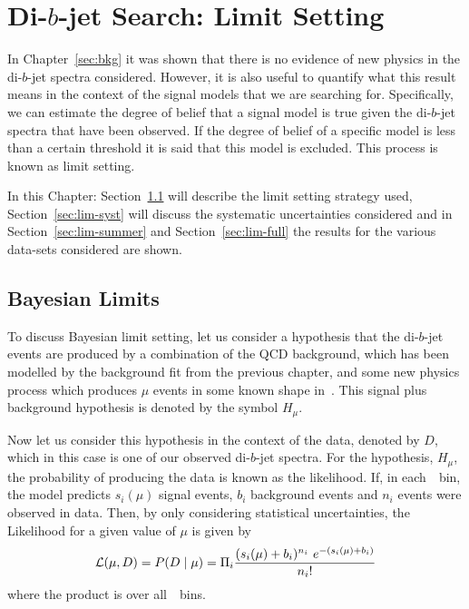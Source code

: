 \chapter{Di-$b$-jet Search: Limit Setting}
\label{sec:lim}


In Chapter~\ref{sec:bkg} it was shown that there is no evidence of new physics in the di-$b$-jet spectra considered.
However, it is also useful to quantify what this result means in the context
of the signal models that we are searching for.
Specifically, we can estimate the degree of belief that a signal model is true given the di-$b$-jet spectra that have been observed.
If the degree of belief of a specific model is less than a certain threshold it is said that this model is excluded.
This process is known as limit setting.

In this Chapter:
Section~\ref{sec:lim-strat} will describe the limit setting strategy used,
Section~\ref{sec:lim-syst} will discuss the systematic uncertainties considered
and in Section~\ref{sec:lim-summer} and Section~\ref{sec:lim-full}
the results for the various data-sets considered are shown.

\section{Bayesian Limits}
\label{sec:lim-strat}

To discuss Bayesian limit setting,
let us consider a hypothesis that the di-$b$-jet events are produced by a combination of 
the QCD background, which has been modelled by the background fit from the previous chapter,
and some new physics process 
which produces $\mu$ events in some known shape in~\mjj.
This signal plus background hypothesis is denoted by the symbol $H_\mu$.

Now let us consider this hypothesis in the context of the data, denoted by $D$,
which in this case is one of our observed di-$b$-jet spectra.
For the hypothesis, $H_\mu$, the probability of producing the data is known as the likelihood.
If, in each~\mjj~bin, the model predicts
$s_i(\mu)$ signal events, $b_i$ background events and $n_i$ events were observed in data.
Then, by only considering statistical uncertainties,  the Likelihood for a given value of $\mu$ is given by
\begin{equation}
  \mathcal{L} (\mu,D) = P(D \mid \mu) =  \Pi_i \frac{(s_i(\mu)+b_i)^{n_i}~e^{-(s_i(\mu)+b_i)}}{n_i!}
\end{equation}
where the product is over all~\mjj~bins.

